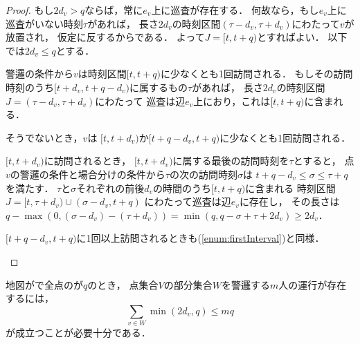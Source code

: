 \begin{proof}
  もし$2d_v > q$ならば，常に$e _v$上に巡査が存在する．
  何故なら，もし$e_v$上に巡査がいない時刻$\tau$があれば，
  長さ$2d_v$の時刻区間$(\tau - d _v, \tau + d _v)$にわたって$v$が放置され，
  仮定に反するからである．
  よって$J =[t, t + q)$とすればよい．
  以下では$2d_v \leq q$とする．

  警邏の条件から$v$は時刻区間$[t, t + q)$に少なくとも1回訪問される．
  もしその訪問時刻のうち$[t + d_v, t + q - d_v)$に属するもの$\tau$があれば，
  長さ$2 d _v$の時刻区間$J = (\tau - d _v, \tau + d _v)$にわたって
  巡査は辺$e_v$上におり，これは$[t, t + q)$に含まれる．

  そうでないとき，$v$は
  $[t, t + d_v)$か$[t + q - d_v, t + q)$に少なくとも1回訪問される．
  \begin{inparaenum}[(i)]
    \item $[t, t + d_v)$に訪問されるとき，
      $[t, t + d_v)$に属する最後の訪問時刻を$\tau$とすると，
      点$v$の警邏の条件と場合分けの条件から$\tau$の次の訪問時刻$\sigma$は
      $t + q - d_v \leq \sigma \leq \tau + q$を満たす．
      $\tau$と$\sigma$それぞれの前後$d_v$の時間のうち$[t, t + q)$に含まれる
      時刻区間$J = [t, \tau + d_v) \cup (\sigma - d_v, t + q)$%
      にわたって巡査は辺$e_v$に存在し，
      その長さは
      $q - \max(0, (\sigma - d_v) - (\tau + d_v))
        = \min(q, q - \sigma + \tau + 2d_v)
        \geq 2d_v$．
      \label{enum:firstInterval}
    \item $[t + q - d_v, t + q)$に1回以上訪問されるときも(\ref{enum:firstInterval})と同様．
    \qedhere
  \end{inparaenum}
\end{proof}


\begin{lemm}
  \label{lemm:StarConditionOfGuarding}
  地図が{\graphStar}で全点の{\maxIdletime}が$q$のとき，
  点集合$V$の部分集合$W$を警邏する$m$人の運行が存在するには，
  \begin{equation}
    \label{equation: star bound}
    \sum_{v \in W} \min(2d_v, q) \leq mq
  \end{equation}
  が成立つことが必要十分である．
\end{lemm}

